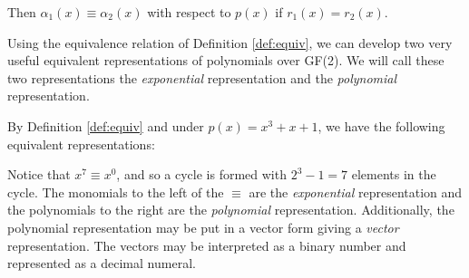 {\begin{definition}
Then $\alpha_1(x)\equiv \alpha_2(x)$ with respect to $p(x)$ if $r_1(x)=r_2(x)$.
\end{definition}

Using the equivalence relation of Definition \ref{def:equiv},
we can develop two very useful equivalent representations of
polynomials over GF(2).
We will call these two representations the {\em exponential} representation
and the {\em polynomial} representation.

\begin{example}
\label{ex:representations}
By Definition \ref{def:equiv} and
under $p(x)=x^3+x+1$, we have the following equivalent representations:

Notice that $x^7\equiv x^0$, and so a cycle is formed with
$2^3-1=7$ elements in the cycle.
The monomials to the left of the $\equiv$ are the {\em exponential}
representation and the polynomials to the right are the {\em polynomial}
representation.
Additionally, the polynomial representation may be put in a vector form giving a
{\em vector} representation.
The vectors may be interpreted as a binary number and represented as a decimal numeral.
\end{example}

}
